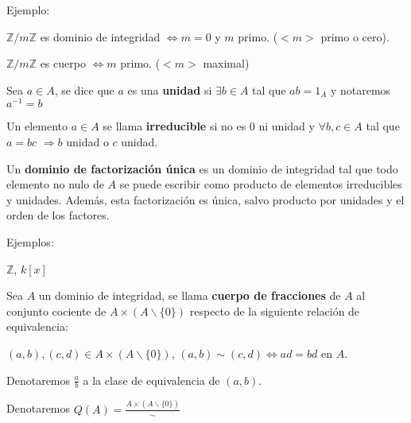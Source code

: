 Ejemplo:

\begin{itemize*}
\item $\mathbb{Z}/m\mathbb{Z}$ es dominio de integridad 
$\Leftrightarrow m =0$ y $m$ primo. ($<m>$ primo o cero).
\item $\mathbb{Z}/m\mathbb{Z}$ es cuerpo $\Leftrightarrow m $ primo. ($<m>$ maximal)
\end{itemize*}


\begin{Def}
Sea $a\in A$, se dice que $a$ es una \textbf{unidad} si $\exists b \in A$ tal que $ab=1_A$ y notaremos $a^{-1}=b$
\end{Def}


\begin{Def}
Un elemento $a\in A$ se llama \textbf{irreducible} si no es 0 ni unidad y $\forall b,c \in A$ tal que $a=bc$ $\Rightarrow b$ unidad o $c$ unidad.
\end{Def}


\begin{Def}
Un \textbf{dominio de factorización única} es un dominio de integridad tal que todo elemento no nulo de $A$ se puede escribir
como producto de elementos irreducibles y unidades. Además, esta factorización es única, salvo producto 
por unidades y el orden de los factores.
\end{Def}

Ejemplos:

\begin{itemize*}
\item $\mathbb{Z}$, $k[x]$
\end{itemize*}


\begin{Def}
Sea $A$ un dominio de integridad, se llama \textbf{cuerpo de fracciones} de $A$ al conjunto cociente de $A \times (A \backslash \{0 \})$ respecto de la siguiente relación de equivalencia:

\begin{itemize*}
\item $(a,b),(c,d)\in A \times (A\backslash \{ 0 \})$,
  $(a,b) \sim (c,d) \Leftrightarrow ad=bd$ en $A$.
\end{itemize*}
\end{Def}

Denotaremos $\frac{a}{b}$ a la clase de equivalencia de $(a,b)$.

Denotaremos $Q(A)=\frac{ A\times (A \backslash \{ 0 \})}{\sim}$

